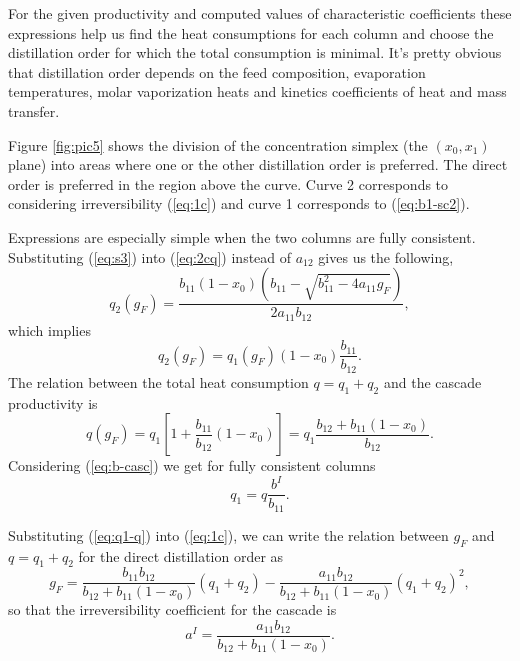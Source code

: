 \documentclass[12pt]{article}
\begin{document}
For the given productivity and computed values of characteristic coefficients these expressions help us find the heat consumptions for each column and choose the distillation order for which the total consumption is minimal. It's pretty obvious that distillation order depends on the feed composition, evaporation temperatures, molar vaporization heats and kinetics coefficients of heat and mass transfer.

Figure \ref{fig:pic5} shows the division of the concentration simplex (the $(x_0,x_1)$ plane) into areas where one or the other distillation order is preferred. The direct order is preferred in the region above the curve. Curve 2 corresponds to considering irreversibility (\ref{eq:1c}) and curve 1 corresponds to (\ref{eq:b1-sc2}).

Expressions are especially simple when the two columns are fully consistent. Substituting (\ref{eq:s3}) into (\ref{eq:2cq}) instead of $a_{12}$ gives us the following,
\begin{equation}
q_2(g_F) = \frac{b_{11}(1-x_0)\left(b_{11}-\sqrt{b_{11}^2-4a_{11}g_F}\right)}{2a_{11}b_{12}},
\end{equation}
which implies
\begin{equation}
q_2(g_F) = q_1(g_F)(1-x_0)\frac{b_{11}}{b_{12}}.
\label{eq:q2q1}
\end{equation}
The relation between the total heat consumption $q = q_1 + q_2$ and the cascade productivity  is
\begin{equation}
q(g_F) = q_1 \left[1 + \frac{b_{11}}{b_{12}}(1-x_0)\right] = q_1\frac{b_{12} + b_{11}(1-x_0)}{b_{12}}.
\end{equation}
Considering (\ref{eq:b-casc}) we get for fully consistent columns
\begin{equation}
q_1 = q\frac{b^I}{b_{11}}.
\label{eq:q1-q}
\end{equation}

Substituting (\ref{eq:q1-q}) into (\ref{eq:1c}), we can write the relation between $g_F$ and $q = q_1 + q_2$ for the direct distillation order as
\begin{equation}
g_F = \frac{b_{11}b_{12}}{b_{12}+b_{11}(1-x_0)}(q_1 + q_2) - \frac{a_{11}b_{12}}{b_{12} + b_{11}(1-x_0)}(q_1 + q_2)^2,
\label{eq:gf-1v}
\end{equation}
so that the irreversibility coefficient for the cascade is
\begin{equation}
a^{I} = \frac{a_{11}b_{12}}{b_{12} + b_{11}(1-x_0)}.
\label{eq:a-casc}
\end{equation}
\end{document}
